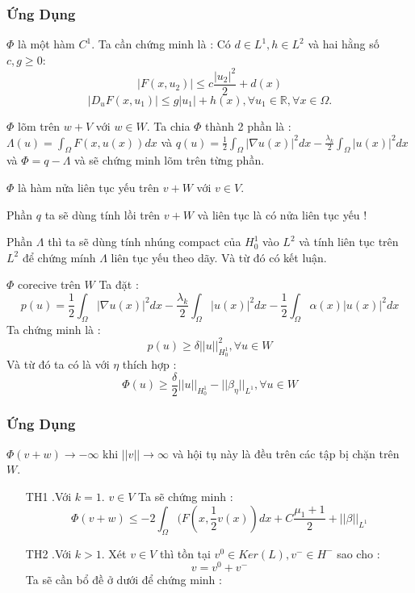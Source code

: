 \documentclass[11pt]{beamer}
\numberwithin{equation}{section}
\theoremstyle{plain}
\theoremstyle{definition}
\theoremstyle{remark}
\begin{document}
\begin{frame}
\frametitle{Ứng Dụng}
\begin{block}{$\Phi$ là một hàm $C^1$.}
Ta cần chứng minh là : Có $d\in L^1,h\in L^2$ và hai hằng số $c,g\geq 0$:
$$|F(x,u_2)|\leq c\frac{|u_2|^2}{2}+d(x)$$
$$|D_uF(x,u_1)|\leq g|u_1|+h(x),\forall u_1\in \mathbb{R},\forall x\in \Omega.$$
\end{block}
\begin{block}{$\Phi$ lõm trên $w+V$ với $w\in W$.}
Ta chia $\Phi$ thành 2 phần là : $\Lambda(u)=\int_{\Omega}F(x,u(x))dx$ và $q(u)=\frac{1}{2}\int_{\Omega}|\nabla u(x)|^2dx-\frac{\lambda_k}{2}\int _{\Omega} |u(x)|^2dx$ và $\Phi=q-\Lambda$ và sẽ chứng minh lõm trên từng phần.
\end{block}
\end{frame}

\begin{frame}
\begin{block}{$\Phi$ là hàm nửa liên tục yếu trên $v+W$ với $v\in V$.}

Phần $q$ ta sẽ dùng tính lồi trên $v+W$ và liên tục là có nửa liên tục yếu !

Phần $\Lambda$ thì ta sẽ dùng tính nhúng compact của $H^1_0$ vào $L^2$ và tính liên tục trên $L^2$ để chứng mính $\Lambda$ liên tục yếu theo dãy. Và từ đó có kết luận.

\end{block}
\begin{block}{$\Phi$ corecive trên $W$}
Ta đặt :$$p(u)=\frac{1}{2}\int_{\Omega}|\nabla u(x)|^2dx-\frac{\lambda_k}{2}\int _{\Omega} |u(x)|^2dx-\frac{1}{2}\int_{\Omega}\alpha(x)|u(x)|^2dx$$
Ta chứng minh là :$$p(u)\geq \delta ||u||^2_{H^1_0},\forall u\in W$$
Và từ đó ta có là với $\eta$ thích hợp :$$\Phi(u)\geq \frac{\delta}{2}||u||_{H^1_0}-||\beta_{\eta}||_{L^1},\forall u\in W$$
\end{block}
\end{frame}

\begin{frame}
\frametitle{Ứng Dụng}
\begin{block}{$\Phi(v+w)\rightarrow -\infty$ khi $||v||\rightarrow \infty$ và hội tụ này là đều trên các tập bị chặn trên $W$.}
\begin{itemize}
\item[TH1].Với $k=1$. $v\in V$ Ta sẽ chứng minh :
$$\Phi(v+w)\leq -2 \int_{\Omega}(F(x,\frac{1}{2} v(x))dx+C\frac{\mu_1+1}{2}+||\beta||_{L^1}$$
\item[TH2].Với $k>1$. Xét $v\in V$ thì tồn tại $v^0\in Ker(L),v^{-}\in H^{-}$ sao cho : $$v=v^0+v^{-}$$
Ta sẽ cần bổ đề ở dưới để chứng minh :
\end{itemize}
\end{block}
\end{frame}
\end{document}
